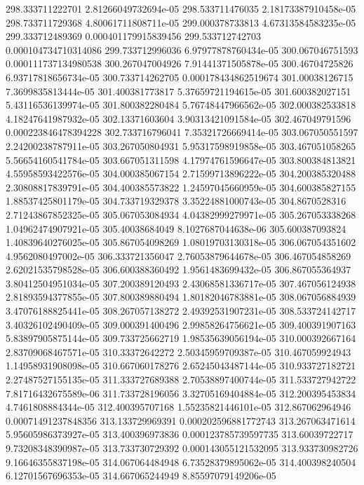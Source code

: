 {298.333711222701 2.81266049732694e-05
298.533711476035 2.18173387910458e-05
298.733711729368 4.80061711808711e-05
299.000378733813 4.67313584583235e-05
299.333712489369 0.000401179915839456
299.533712742703 0.000104734710314086
299.733712996036 6.97977878760434e-05
300.067046751593 0.000111737134980538
300.267047004926 7.91441371505878e-05
300.46704725826 6.93717818656734e-05
300.733714262705 0.000178434862519674
301.00038126715 7.3699835813444e-05
301.400381773817 5.37659721194615e-05
301.600382027151 5.43116536139974e-05
301.800382280484 5.76748447966562e-05
302.000382533818 4.18247641987932e-05
302.13371603604 3.90313421091584e-05
302.467049791596 0.000223846478394228
302.733716796041 7.35321726669414e-05
303.067050551597 2.24200238787911e-05
303.267050804931 5.95317598919858e-05
303.467051058265 5.56654160541784e-05
303.667051311598 4.17974761596647e-05
303.800384813821 4.55958593422576e-05
304.000385067154 2.71599713896222e-05
304.200385320488 2.30808817839791e-05
304.400385573822 1.24597045660959e-05
304.600385827155 1.88537425801179e-05
304.733719329378 3.35224881000743e-05
304.8670528316 2.71243867852325e-05
305.067053084934 4.04382999279971e-05
305.267053338268 1.04962474907921e-05
305.40038684049 8.1027687044638e-06
305.600387093824 1.40839640276025e-05
305.867054098269 1.08019703130318e-05
306.067054351602 4.9562080497002e-05
306.333721356047 2.76053879644678e-05
306.467054858269 2.62021535798528e-05
306.600388360492 1.9561483699432e-05
306.867055364937 3.80412504951034e-05
307.200389120493 2.43068581336717e-05
307.467056124938 2.81893594377855e-05
307.800389880494 1.80182046783881e-05
308.067056884939 3.47076188825441e-05
308.267057138272 2.49392531907231e-05
308.533724142717 3.40326102490409e-05
309.000391400496 2.99858264756621e-05
309.400391907163 5.83897905875144e-05
309.733725662719 1.98535639056194e-05
310.000392667164 2.83709068467571e-05
310.33372642272 2.50345959709387e-05
310.467059924943 1.14958931908098e-05
310.667060178276 2.65245043487144e-05
310.933727182721 2.27487527155135e-05
311.333727689388 2.70538897400744e-05
311.533727942722 7.81716432675589e-06
311.733728196056 3.32705169404884e-05
312.200395453834 4.7461808884344e-05
312.400395707168 1.55235821446101e-05
312.867062964946 0.00071491237848356
313.133729969391 0.000202596881772743
313.267063471614 5.95605986373927e-05
313.400396973836 0.000123785739597735
313.60039722717 9.73208348390987e-05
313.733730729392 0.000143055121532095
313.933730982726 9.16646355837198e-05
314.067064484948 6.73528379895062e-05
314.400398240504 6.12701567696353e-05
314.667065244949 8.85597079149206e-05
}
